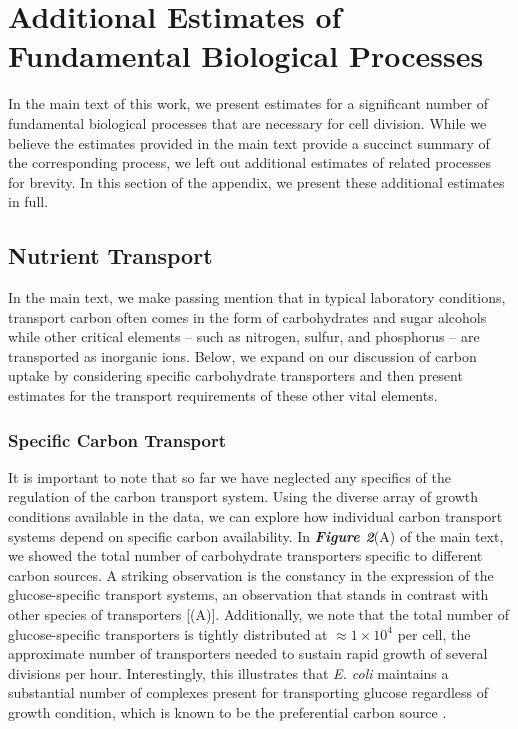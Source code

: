 \section{Additional Estimates of Fundamental Biological Processes}
\label{sec:SI_nutr_trans}

In the main text of this work, we present estimates for a significant number of
fundamental biological processes that are necessary for cell division. While we
believe the estimates provided in the main text provide a succinct summary of
the corresponding process, we left out additional estimates of related
processes for brevity. In this section of the appendix, we present these
additional estimates in full.

\subsection{Nutrient Transport}
In the main text, we make passing mention that in typical laboratory conditions,
transport carbon often comes in the form of carbohydrates and sugar alcohols
while other critical elements -- such as nitrogen, sulfur, and phosphorus -- are
transported as inorganic ions. Below, we expand on our discussion of carbon uptake by
considering specific carbohydrate transporters and then present estimates for the transport
requirements of these other vital elements.

\subsubsection{Specific Carbon Transport}
It is important to note that so far we have neglected any specifics of the
regulation of the carbon transport system. Using the diverse array of growth
conditions available in the data, we can explore how individual carbon transport
systems depend on specific carbon availability. In
\textbf{\textit{Figure 2}}(A) of the main text, we showed the total number of
carbohydrate transporters specific to different carbon sources. A striking
observation is the  constancy in the expression of the glucose-specific
transport systems, an observation that stands in contrast with other species of
transporters [(A)]. Additionally, we note that the
total number of glucose-specific transporters is tightly distributed at $\approx
1\times 10^4$ per cell, the approximate number of transporters needed to sustain
rapid growth of several divisions per hour. Interestingly, this illustrates that
\textit{E. coli} maintains a substantial number of complexes present for
transporting glucose regardless of growth condition, which is known to be the
preferential carbon source \citep{monod1947, liu2005a, aidelberg2014}.

